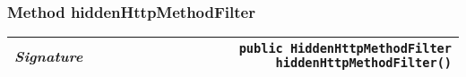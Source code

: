 \begin{adjustwidth}{1.5em}{0pt}
\begin{adjustwidth}{1.5em}{0pt}
\begin{adjustwidth}{1.5em}{0pt}
{\begin{tabularx}{1.0\linewidth}{@{}l R@{}}
      \end{tabularx}}
    \end{adjustwidth}\subsubsection{Method hiddenHttpMethodFilter\label{edu.kit.hci.soli.config.WebConfig@hiddenHttpMethodFilter()}}
    \begin{adjustwidth}{1.5em}{0pt}
      {\begin{tabularx}{1.0\linewidth}{@{}l R@{}}
        \emph{Signature} & \texttt{public \texttt{HiddenHttpMethodFilter} hiddenHttpMethodFilter()} \\
        \hline
  
      \end{tabularx}}
    \end{adjustwidth}
  \end{adjustwidth}
\end{adjustwidth}